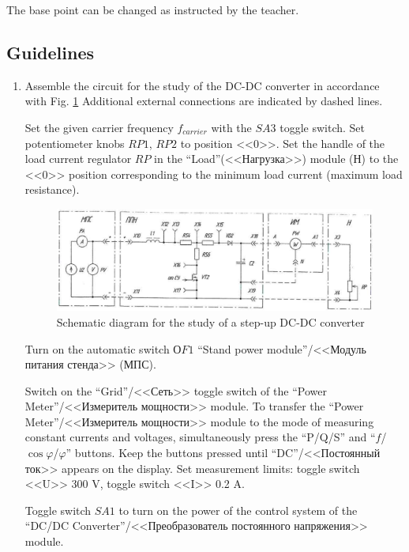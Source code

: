 \documentclass[a4paper,14pt]{article}
\begin{document}
\noindent The base point can be changed as instructed by the teacher.

\subsection{Guidelines}

\begin{enumerate}
	\item 
		Assemble the circuit for the study of the DC-DC converter in accordance with Fig. \ref{ris2}
Additional external connections are indicated by dashed lines.

Set the given carrier frequency $f_{carrier}$ with the $SA3$ toggle switch.
Set potentiometer knobs $RP1$, $RP2$ to position <<0>>.
Set the handle of the load current regulator $RP$ in the ``Load''(<<Нагрузка>>) module (Н) to the <<0>> position 
corresponding to the minimum load current (maximum load resistance).



\begin{figure}[!ht]
\includegraphics[scale=0.3]{img_61}
\caption{Schematic diagram for the study of a step-up DC-DC converter}
	\label{ris2}
\end{figure}






Turn on the automatic switch $ОF1$ ``Stand power module''/<<Модуль питания стенда>> (МПС).

Switch on the ``Grid''/<<Сеть>> toggle switch of the ``Power Meter''/<<Изме\-ри\-тель мощности>> module.
To transfer the ``Power Meter''/<<Измеритель мощности>> module to the mode of measuring constant currents and voltages, 
simultaneously press the ``P/Q/S'' and ``$f$/$\cos \varphi$/$\varphi$'' buttons.
Keep the buttons pressed until ``DC''/<<Постоянный ток>> appears on the display.
Set measurement limits: toggle switch <<U>> 300 V, toggle switch <<I>> 0.2 A.

Toggle switch $SA1$ to turn on the power of the control system 
		of the ``DC/DC Converter''/<<Преобразователь постоянного напряжения>> module.


\end{enumerate}
\end{document}
